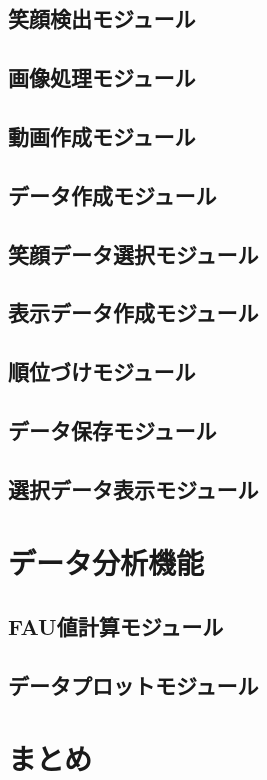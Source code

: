 \subsection{笑顔検出モジュール}
\subsection{画像処理モジュール}
\subsection{動画作成モジュール}
\subsection{データ作成モジュール}
\subsection{笑顔データ選択モジュール}
\subsection{表示データ作成モジュール}
\subsection{順位づけモジュール}
\subsection{データ保存モジュール}
\subsection{選択データ表示モジュール}

\section{データ分析機能}
\subsection{FAU値計算モジュール}
\subsection{データプロットモジュール}
\section{まとめ}
